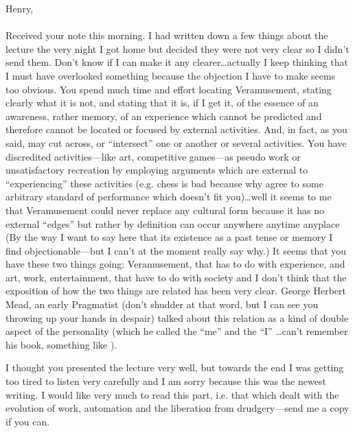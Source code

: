 \noindent
Henry, \\
\\
Received your note this morning. I had written down a few things about the 
lecture the very night I got home but decided they were not very clear so I 
didn't send them. Don't know if I can make it any clearer\ldots actually I keep 
thinking that I must have overlooked something because the objection I have 
to make seems too obvious. You spend much time and effort locating 
Veramusement, stating clearly what it is not, and stating that it is, if I get it, 
of the essence of an awareness, rather memory, of an experience which 
cannot be predicted and therefore cannot be located or focused by external 
activities. And, in fact, as you said, may cut across, or \enquote{intersect} one or 
another or several activities. You have discredited activities---like art, 
competitive games---as pseudo work or unsatisfactory recreation by employing 
arguments which are external to \enquote{experiencing} these activities (e.g. chess is 
bad because why agree to some arbitrary standard of performance which 
doesn't fit you)\ldots well it seems to me that Veramusement could never replace 
any cultural form because it has no external \enquote{edges} but rather by definition 
can occur anywhere anytime anyplace (By the way I want to say here that 
its existence as a past tense or memory I find objectionable---but I can't at the 
moment really say why.) It seems that you have these two things going: 
Veramusement, that has to do with experience, and art, work, 
entertainment, that have to do with society and I don't think that the 
exposition of how the two things are related has been very clear. George 
Herbert Mead, an early Pragmatist (don't shudder at that word, but I can see 
you throwing up your hands in despair) talked about this relation as a kind 
of double aspect of the personality (which he called the \enquote{me} and the \enquote{I} 
\ldots can't remember his book, something like ). 

I thought you presented the lecture very well, but towards the end I was 
getting too tired to listen very carefully and I am sorry because this was the 
newest writing. I would like very much to read this part, i.e. that which dealt 
with the evolution of work, automation and the liberation from 
drudgery---send me a copy if you can. 

\vfill


